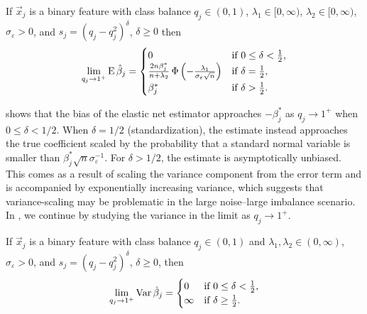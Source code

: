 \begin{theorem}
  \label{thm:classbalance-bias}
  If \(\vec{x}_j\) is a binary feature with class balance \(q_j \in (0, 1)\), \(\lambda_1 \in [0,\infty)\), \(\lambda_2 \in [0,\infty)\), \(\sigma_\varepsilon > 0\), and \(s_j = (q_j - q_j^2)^{\delta}\), \(\delta \geq 0\)  then
  \[
    \lim_{q_j \rightarrow 1^+} \operatorname{E} \hat{\beta}_j =
    \begin{cases}
      0                                                                                                  & \text{if } 0 \leq \delta < \frac{1}{2}, \\
      \frac{2n \beta_j^*}{n + \lambda_2} \operatorname{\Phi}\left(-\frac{\lambda_1}{\sigma_\varepsilon \sqrt{n}}\right) & \text{if } \delta = \frac{1}{2},        \\
      \beta^*_j                                                                                          & \text{if } \delta > \frac{1}{2}.
    \end{cases}
  \]
\end{theorem}

 shows that the bias of the elastic net estimator approaches
\(-\beta_j^*\) as \(q_j \rightarrow 1^+\) when \(0 \leq \delta < 1/2\). When \(\delta =
1/2\) (standardization), the estimate instead approaches the true coefficient scaled by the
probability that a standard normal variable is smaller than
\(\beta_j^*\sqrt{n}\sigma_\varepsilon^{-1}\). For \(\delta > 1/2\), the estimate is
asymptotically unbiased. This comes as a result of scaling the variance component from the
error term and is accompanied by exponentially increasing variance, which suggests that
variance-scaling may be problematic in the large noise--large imbalance scenario. In
, we continue by studying the variance in the limit as
\(q_j \rightarrow 1^+\).

\begin{theorem}
  \label{thm:classbalance-variance}
  If \(\vec{x}_j\) is a binary feature with class balance \(q_j \in (0, 1)\) and \(\lambda_1,\lambda_2 \in (0,\infty)\), \(\sigma_\varepsilon > 0\), and \(s_j = (q_j - q_j^2)^{\delta}\), \(\delta \geq 0\), then
  \[
    \lim_{q_j \rightarrow 1^+} \operatorname{Var} \hat{\beta}_j =
    \begin{cases}
      0      & \text{if } 0 \leq \delta < \frac{1}{2}, \\
      \infty & \text{if } \delta \geq \frac{1}{2}.
    \end{cases}
  \]
\end{theorem}

